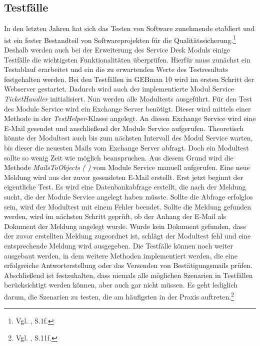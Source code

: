\subsection{Testfälle}
\noindent
In den letzten Jahren hat sich das Testen von Software zunehmende etabliert und ist ein fester Bestandteil von Softwareprojekten für die Qualitätssicherung.\footnote{Vgl.\citeauthor{Vivenzio} \citeyear{Vivenzio}, S.1f.} Deshalb werden auch bei der Erweiterung des Service Desk Moduls einige Testfälle die wichtigsten Funktionalitäten überprüfen. Hierfür muss zunächst ein Testablauf erarbeitet und ein die zu erwartenden Werte des Testresultats festgehalten werden.\newline
Bei den Testfällen in GEBman 10 wird im ersten Schritt der Webserver gestartet. Dadurch wird auch der implementierte Modul Service \textit{TicketHandler} initialisiert. Nun werden alle Modultests ausgeführt. Für den Test des Module Service wird ein Exchange Server benötigt. Dieser wird mittels einer Methode in der \textit{TestHelper}-Klasse angelegt. An diesen Exchange Service wird eine E-Mail gesendet und anschließend der Module Service aufgerufen. Theoretisch könnte der Modultest auch bis zum nächsten Intervall des Modul Service warten, bis dieser die neuesten Mails vom Exchange Server abfragt. Doch ein Modultest sollte so wenig Zeit wie möglich beanspruchen. Aus diesem Grund wird die Methode \textit{MailsToObjects ( )} vom Module Service manuell aufgerufen. Eine neue Meldung wird aus der zuvor gesendeten E-Mail erstellt. Erst jetzt beginnt der eigentliche Test. Es wird eine Datenbankabfrage erstellt, die nach der Meldung sucht, die der Module Service angelegt haben müsste. Sollte die Abfrage erfolglos sein, wird der Modultest mit einem Fehler beendet. Sollte die Meldung gefunden werden, wird im nächsten Schritt geprüft, ob der Anhang der E-Mail als Dokument der Meldung angelegt wurde. Wurde kein Dokument gefunden, dass der zuvor erstellten Meldung zugeordnet ist, schlägt der Modultest fehl und eine entsprechende Meldung wird ausgegeben.\newline
Die Testfälle können noch weiter ausgebaut werden, in dem weitere Methoden implementiert werden, die eine erfolgreiche Antworterstellung oder das Versenden von Bestätigungsmails prüfen. Abschließend ist festzuhalten, dass niemals alle möglichen Szenarien in Testfällen berücksichtigt werden können, aber auch gar nicht müssen. Es geht lediglich darum, die Szenarien zu testen, die am häufigsten in der Praxis auftreten.\footnote{Vgl. \citeauthor{Witte} \citeyear{Witte}, S.11f.}\\


